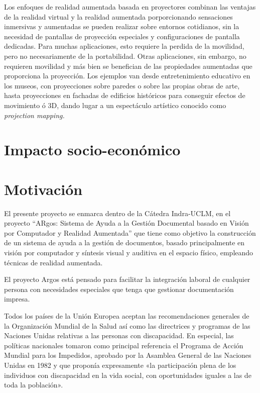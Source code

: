 Los enfoques de realidad aumentada basada en proyectores combinan las ventajas de la realidad virtual y la realidad aumentada porporcionando sensaciones inmersivas y aumentadas se pueden realizar sobre entornos cotidianos, sin la necesidad de pantallas de proyección especiales y configuraciones de pantalla dedicadas. Para muchas aplicaciones, esto requiere la perdida de la movilidad, pero no necesariamente de la portabilidad. Otras aplicaciones, sin embargo, no requieren movilidad y más bien se benefician de las propiedades aumentadas que proporciona la proyección. Los ejemplos van desde entretenimiento educativo en los museos, con proyecciones sobre paredes o sobre las propias obras de arte, hasta proyecciones en fachadas de edificios históricos para conseguir efectos de movimiento ó 3D, dando lugar a un espectáculo artístico conocido como \emph{projection mapping.}

\section{Impacto socio-económico}

\section{Motivación}
  El presente proyecto se enmarca dentro de la Cátedra Indra-UCLM, en el proyecto “ARgos: Sistema de Ayuda a la Gestión Documental basado en Visión por Computador y Realidad Aumentada” que tiene como objetivo la construcción de un sistema de ayuda a la gestión de documentos, basado principalmente en visión por computador y síntesis visual y auditiva en el espacio físico, empleando técnicas de realidad aumentada.  
  
  El proyecto Argos está pensado para facilitar la integración laboral de cualquier persona con necesidades especiales que tenga que gestionar documentación impresa. 
  
  Todos los países de la Unión Europea aceptan las recomendaciones generales de la Organización Mundial de la Salud así como las directrices y programas de las Naciones Unidas relativas a las personas con discapacidad.  En especial, las políticas nacionales tomaron como principal referencia el Programa de Acción Mundial para los Impedidos, aprobado por la Asamblea General de las Naciones Unidas en 1982 y que proponía expresamente «la participación plena de los individuos con discapacidad en la vida social, con oportunidades iguales a las de toda la población». 

